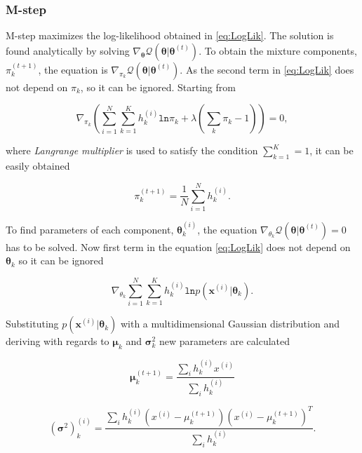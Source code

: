 \subsubsection{M-step}

M-step maximizes the log-likelihood obtained in \ref{eq:LogLik}. The solution is found analytically by solving $\nabla_{\boldsymbol \theta} \mathcal{Q}(\boldsymbol \theta | \boldsymbol \theta^{(t)})$. To obtain the mixture components, $\pi_k^{(t+1)}$, the equation is $\nabla_{\pi_k}\mathcal{Q}(\boldsymbol \theta | \boldsymbol \theta^{(t)})$. As the second term in \ref{eq:LogLik} does not depend on $\pi_k$, so it can be ignored. Starting from 

\begin{equation}
	\nabla_{\pi_k} \left ( \sum_{i=1}^N \sum_{k=1}^K h_k^{(i)} \mathtt{ln}\pi_k + \lambda \left ( \sum_k\pi_k - 1 \right )  \right ) = 0,
\end{equation}

where \textit{Langrange multiplier} is used to satisfy the condition $\sum_{k=1}^{K} = 1$, it can be easily obtained 

\begin{equation}
	\pi_k^{(t+1)} = \frac{1}{N} \sum_{i=1}^N h_k^{(i)}.
\end{equation}

To find parameters of each component, $\boldsymbol \theta_k^{(i)}$, the equation $\nabla_{\theta_k} \mathcal{Q}(\boldsymbol \theta | \boldsymbol \theta^{(t)}) = 0$ has to be solved. Now first term in the equation \ref{eq:LogLik} does not depend on $\boldsymbol \theta_k$ so it can be ignored 

\begin{equation}
	\nabla_{\theta_k} \sum_{i=1}^N \sum_{k=1}^K h_k^{(i)}\mathtt{ln}p(\mathbf{x}^{(i)} | \boldsymbol \theta_k).
\end{equation}

Substituting $p(\mathbf{x}^{(i)} | \boldsymbol \theta_k)$ with a multidimensional Gaussian distribution and deriving with regards to $\boldsymbol \mu_k$ and $\boldsymbol \sigma_k^2$ new parameters are calculated

\begin{equation}
	\boldsymbol \mu_k^{(t+1)} = \frac{\sum_ih_k^{(i)}x^{(i)}}{\sum_ih_k^{(i)}} 
\end{equation}

\begin{equation}
	(\boldsymbol \sigma^2)_k^{(i)} = \frac{\sum_ih_k^{(i)}(x^{(i)} - \mu_k^{(t+1)})(x^{(i)} - \mu_k^{(t+1)})^T}{{\sum_ih_k^{(i)}}}.
\end{equation}

